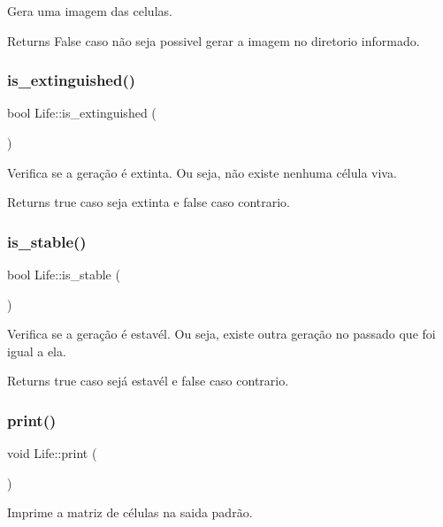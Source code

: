 Gera uma imagem das celulas. \begin{DoxyReturn}{Returns}
False caso não seja possivel gerar a imagem no diretorio informado. 
\end{DoxyReturn}
\mbox{\label{class_life_a899b47868b05b388ae320cf4ad34ac50}} 
\subsubsection{is\+\_\+extinguished()}
{\footnotesize\ttfamily bool Life\+::is\+\_\+extinguished (\begin{DoxyParamCaption}{ }\end{DoxyParamCaption})}

Verifica se a geração é extinta. Ou seja, não existe nenhuma célula viva. \begin{DoxyReturn}{Returns}
true caso seja extinta e false caso contrario. 
\end{DoxyReturn}
\mbox{\label{class_life_a773454947fcc1f7c576c8749647d9ba2}} 
\subsubsection{is\+\_\+stable()}
{\footnotesize\ttfamily bool Life\+::is\+\_\+stable (\begin{DoxyParamCaption}{ }\end{DoxyParamCaption})}

Verifica se a geração é estavél. Ou seja, existe outra geração no passado que foi igual a ela. \begin{DoxyReturn}{Returns}
true caso sejá estavél e false caso contrario. 
\end{DoxyReturn}
\mbox{\label{class_life_a502bd46fefb24950e64865ce87c4b670}} 
\subsubsection{print()}
{\footnotesize\ttfamily void Life\+::print (\begin{DoxyParamCaption}{ }\end{DoxyParamCaption})}

Imprime a matriz de células na saida padrão. \mbox{\label{class_life_afc6f2d0b5b7c893fcf2c20265c622f31}} 
